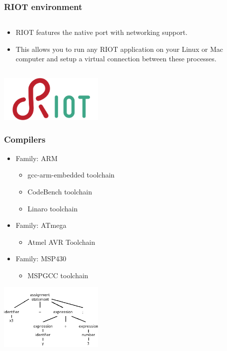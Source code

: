 \documentclass{beamer}
\begin{document}
\begin{frame}
	\frametitle{RIOT environment}
	\begin{columns}[c]
		\begin{column}{30cm}
			\vspace{.1cm}
			\begin{itemize}
				\justifying
				\item RIOT features the native port with networking support.
				\item This allows you to run any RIOT application on your Linux or Mac\\
				computer and setup a virtual connection between these processes.
			\end{itemize}
		\end{column}
	\end{columns}
	\vspace{.5cm}
	\hspace*{5.5cm} \includegraphics[width=5cm]{figs/riot-logo.png}
\end{frame}

\begin{frame}
	\frametitle{Compilers}
	\vspace{.1cm}
	\begin{itemize}
		\justifying
		\item Family: ARM
		\begin{itemize}
			\item gcc-arm-embedded toolchain
			\item CodeBench toolchain
			\item Linaro toolchain
		\end{itemize}
		\item Family: ATmega
		\begin{itemize}
			\item Atmel AVR Toolchain
		\end{itemize}
		\item Family: MSP430
		\begin{itemize}
			\item MSPGCC toolchain
		\end{itemize}
	\end{itemize}
	\vspace{.5cm}
	\hspace*{5.5cm} \includegraphics[width=5cm]{figs/parse-tree.png}
\end{frame}
\end{document}
